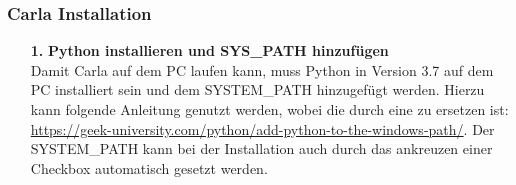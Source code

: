 \subsubsection{Carla Installation}
\begin{itemize}
	\item[\textbf{1.}] \textbf{Python installieren und SYS\_PATH hinzufügen}\\
	Damit Carla auf dem PC laufen kann, muss Python in Version 3.7 auf dem PC installiert sein und dem SYSTEM\_PATH hinzugefügt werden. Hierzu kann folgende Anleitung genutzt werden, wobei die \grqq durch eine \grqq zu ersetzen ist: \url{https://geek-university.com/python/add-python-to-the-windows-path/}. Der SYSTEM\_PATH kann bei der Installation auch durch das ankreuzen einer Checkbox automatisch gesetzt werden.
	

\end{itemize}
